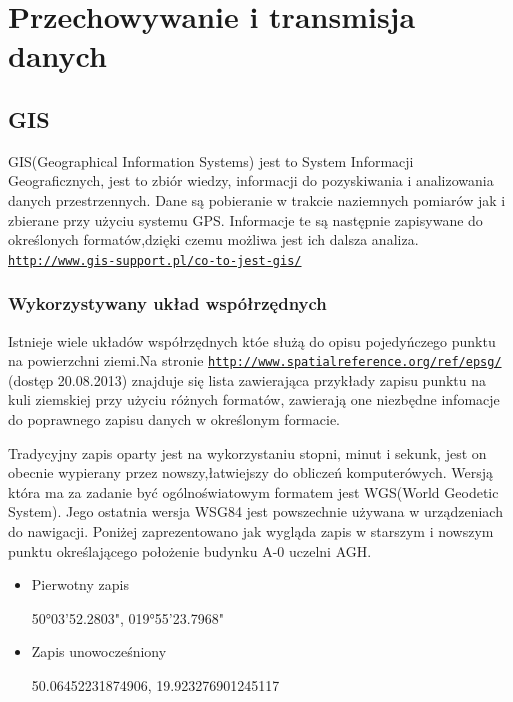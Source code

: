 \clearpage
\newpage
\section{Przechowywanie i transmisja danych}
\label{sec:przesyl}

\subsection{GIS}
\label{subsec:gis}

GIS(Geographical Information Systems) jest to System Informacji Geograficznych, jest to zbiór wiedzy, informacji do pozyskiwania i analizowania danych przestrzennych. Dane są pobieranie w trakcie naziemnych pomiarów jak i zbierane przy użyciu systemu GPS. Informacje te są następnie zapisywane do określonych formatów,dzięki czemu możliwa jest ich dalsza analiza. \underline{\texttt{http://www.gis-support.pl/co-to-jest-gis/}}

\subsubsection{Wykorzystywany układ współrzędnych}
\label{subsec:uklad}

Istnieje wiele układów współrzędnych któe służą do opisu pojedyńczego punktu na powierzchni ziemi.Na stronie \underline{\texttt{http://www.spatialreference.org/ref/epsg/}} (dostęp 20.08.2013) znajduje się lista zawierająca przykłady zapisu punktu na kuli ziemskiej przy użyciu różnych formatów, zawierają one niezbędne infomacje do poprawnego zapisu danych w określonym formacie.

Tradycyjny zapis oparty jest na wykorzystaniu stopni, minut i sekunk, jest on obecnie wypierany przez nowszy,łatwiejszy do obliczeń komputerówych. Wersją która ma za zadanie być ogólnoświatowym formatem jest WGS(World Geodetic System). Jego ostatnia wersja  WSG84 jest powszechnie używana w urządzeniach do nawigacji. Poniżej zaprezentowano jak wygląda zapis w starszym i nowszym punktu określającego położenie budynku A-0 uczelni AGH.

\begin{itemize}

\item
Pierwotny zapis

50°03'52.2803", 019°55'23.7968"
\item
Zapis unowocześniony

50.06452231874906, 19.923276901245117
\end{itemize}

